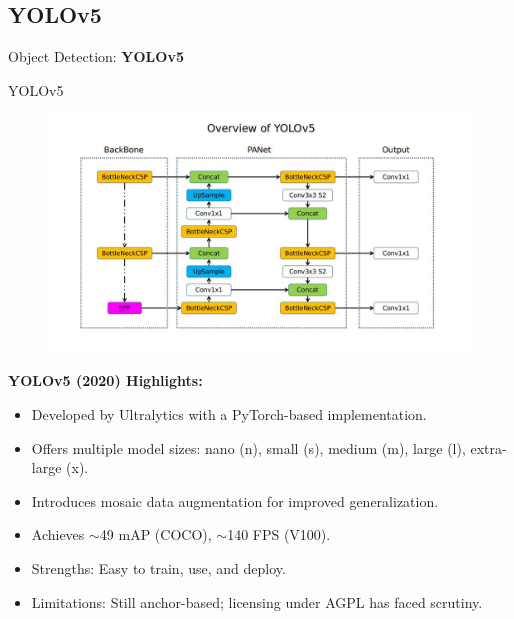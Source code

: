 \subsection{YOLOv5}
\begin{frame}{}
    \LARGE Object Detection: \textbf{YOLOv5}
\end{frame}

\begin{frame}[allowframebreaks]{YOLOv5}
    \begin{figure}
        \centering
        \includegraphics[width=1.0\textwidth,height=0.9\textheight,keepaspectratio]{images/object-detect/yolo-v5.png}
    \end{figure}
\framebreak
    \textbf{YOLOv5 (2020) Highlights:}
    \begin{itemize}
        \item Developed by Ultralytics with a PyTorch-based implementation.
        \item Offers multiple model sizes: nano (n), small (s), medium (m), large (l), extra-large (x).
        \item Introduces mosaic data augmentation for improved generalization.
        \item Achieves $\sim$49 mAP (COCO), $\sim$140 FPS (V100).
        \item Strengths: Easy to train, use, and deploy.
        \item Limitations: Still anchor-based; licensing under AGPL has faced scrutiny.
    \end{itemize}
\end{frame}